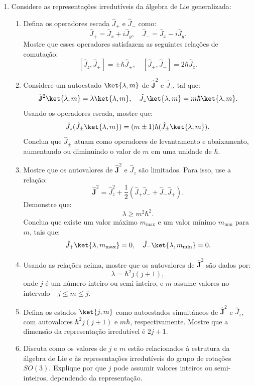 \begin{enumerate}
	\item Considere as representações irredutíveis da álgebra de Lie generalizada:
	      \begin{enumerate}
		      \item Defina os operadores escada \(\hat{J}_+\) e \(\hat{J}_-\) como:
		            \[
			            \hat{J}_+ = \hat{J}_x + i\hat{J}_y, \quad \hat{J}_- = \hat{J}_x - i\hat{J}_y.
		            \]
		            Mostre que esses operadores satisfazem as seguintes relações de comutação:
		            \[
			            [\hat{J}_z, \hat{J}_\pm] = \pm\hbar \hat{J}_\pm, \quad [\hat{J}_+, \hat{J}_-] = 2\hbar \hat{J}_z.
		            \]
		      \item Considere um autoestado \(\ket{\lambda, m}\) de \(\hat{\mathbf{J}}^2\) e \(\hat{J}_z\), tal que:
		            \[
			            \hat{\mathbf{J}}^2 \ket{\lambda, m} = \lambda \ket{\lambda, m}, \quad \hat{J}_z \ket{\lambda, m} = m\hbar \ket{\lambda, m}.
		            \]
		            Usando os operadores escada, mostre que:
		            \[
			            \hat{J}_z (\hat{J}_\pm \ket{\lambda, m}) = (m \pm 1)\hbar (\hat{J}_\pm \ket{\lambda, m}).
		            \]
		            Conclua que \(\hat{J}_\pm\) atuam como operadores de levantamento e abaixamento, aumentando ou diminuindo o valor de \(m\) em uma unidade de \(\hbar\).
		      \item Mostre que os autovalores de \(\hat{\mathbf{J}}^2\) e \(\hat{J}_z\) são limitados. Para isso, use a relação:
		            \[
			            \hat{\mathbf{J}}^2 = \hat{J}_z^2 + \frac{1}{2}(\hat{J}_+ \hat{J}_- + \hat{J}_- \hat{J}_+).
		            \]
		            Demonstre que:
		            \[
			            \lambda \geq m^2\hbar^2.
		            \]
		            Conclua que existe um valor máximo \(m_{\text{max}}\) e um valor mínimo \(m_{\text{min}}\) para \(m\), tais que:
		            \[
			            \hat{J}_+ \ket{\lambda, m_{\text{max}}} = 0, \quad \hat{J}_- \ket{\lambda, m_{\text{min}}} = 0.
		            \]
		      \item Usando as relações acima, mostre que os autovalores de \(\hat{\mathbf{J}}^2\) são dados por:
		            \[
			            \lambda = \hbar^2 j(j+1),
		            \]
		            onde \(j\) é um número inteiro ou semi-inteiro, e \(m\) assume valores no intervalo \(-j \leq m \leq j\).
		      \item Defina os estados \(\ket{j, m}\) como autoestados simultâneos de \(\hat{\mathbf{J}}^2\) e \(\hat{J}_z\), com autovalores \(\hbar^2 j(j+1)\) e \(m\hbar\), respectivamente. Mostre que a dimensão da representação irredutível é \(2j + 1\).
		      \item Discuta como os valores de \(j\) e \(m\) estão relacionados à estrutura da álgebra de Lie e às representações irredutíveis do grupo de rotações \(SO(3)\). Explique por que \(j\) pode assumir valores inteiros ou semi-inteiros, dependendo da representação.
	      \end{enumerate}


\end{enumerate}
